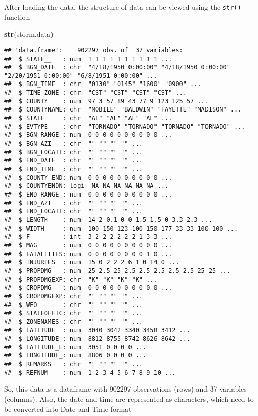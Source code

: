 \documentclass[]{article}
\newenvironment{Shaded}{\begin{snugshade}}{\end{snugshade}}
\newcommand{\KeywordTok}[1]{\textcolor[rgb]{0.13,0.29,0.53}{\textbf{#1}}}
\newcommand{\NormalTok}[1]{#1}
\begin{document}
After loading the data, the structure of data can be viewed using the
\texttt{str()} function

\begin{Shaded}
\begin{Highlighting}[]
\KeywordTok{str}\NormalTok{(storm.data)}
\end{Highlighting}
\end{Shaded}

\begin{verbatim}
## 'data.frame':    902297 obs. of  37 variables:
##  $ STATE__   : num  1 1 1 1 1 1 1 1 1 1 ...
##  $ BGN_DATE  : chr  "4/18/1950 0:00:00" "4/18/1950 0:00:00" "2/20/1951 0:00:00" "6/8/1951 0:00:00" ...
##  $ BGN_TIME  : chr  "0130" "0145" "1600" "0900" ...
##  $ TIME_ZONE : chr  "CST" "CST" "CST" "CST" ...
##  $ COUNTY    : num  97 3 57 89 43 77 9 123 125 57 ...
##  $ COUNTYNAME: chr  "MOBILE" "BALDWIN" "FAYETTE" "MADISON" ...
##  $ STATE     : chr  "AL" "AL" "AL" "AL" ...
##  $ EVTYPE    : chr  "TORNADO" "TORNADO" "TORNADO" "TORNADO" ...
##  $ BGN_RANGE : num  0 0 0 0 0 0 0 0 0 0 ...
##  $ BGN_AZI   : chr  "" "" "" "" ...
##  $ BGN_LOCATI: chr  "" "" "" "" ...
##  $ END_DATE  : chr  "" "" "" "" ...
##  $ END_TIME  : chr  "" "" "" "" ...
##  $ COUNTY_END: num  0 0 0 0 0 0 0 0 0 0 ...
##  $ COUNTYENDN: logi  NA NA NA NA NA NA ...
##  $ END_RANGE : num  0 0 0 0 0 0 0 0 0 0 ...
##  $ END_AZI   : chr  "" "" "" "" ...
##  $ END_LOCATI: chr  "" "" "" "" ...
##  $ LENGTH    : num  14 2 0.1 0 0 1.5 1.5 0 3.3 2.3 ...
##  $ WIDTH     : num  100 150 123 100 150 177 33 33 100 100 ...
##  $ F         : int  3 2 2 2 2 2 2 1 3 3 ...
##  $ MAG       : num  0 0 0 0 0 0 0 0 0 0 ...
##  $ FATALITIES: num  0 0 0 0 0 0 0 0 1 0 ...
##  $ INJURIES  : num  15 0 2 2 2 6 1 0 14 0 ...
##  $ PROPDMG   : num  25 2.5 25 2.5 2.5 2.5 2.5 2.5 25 25 ...
##  $ PROPDMGEXP: chr  "K" "K" "K" "K" ...
##  $ CROPDMG   : num  0 0 0 0 0 0 0 0 0 0 ...
##  $ CROPDMGEXP: chr  "" "" "" "" ...
##  $ WFO       : chr  "" "" "" "" ...
##  $ STATEOFFIC: chr  "" "" "" "" ...
##  $ ZONENAMES : chr  "" "" "" "" ...
##  $ LATITUDE  : num  3040 3042 3340 3458 3412 ...
##  $ LONGITUDE : num  8812 8755 8742 8626 8642 ...
##  $ LATITUDE_E: num  3051 0 0 0 0 ...
##  $ LONGITUDE_: num  8806 0 0 0 0 ...
##  $ REMARKS   : chr  "" "" "" "" ...
##  $ REFNUM    : num  1 2 3 4 5 6 7 8 9 10 ...
\end{verbatim}

So, this data is a dataframe with 902297 observations (rows) and 37
variables (columns). Also, the date and time are represented as
characters, which need to be converted into Date and Time format
\end{document}

